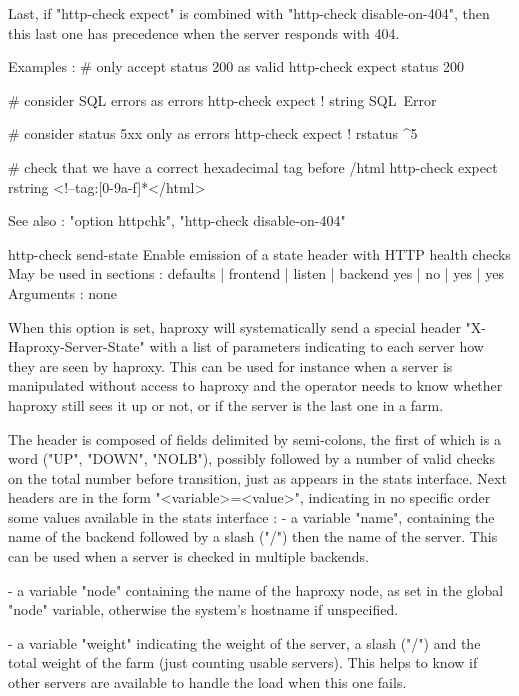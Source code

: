   Last, if "http-check expect" is combined with "http-check disable-on-404",
  then this last one has precedence when the server responds with 404.

  Examples :
         # only accept status 200 as valid
         http-check expect status 200

         # consider SQL errors as errors
         http-check expect ! string SQL\ Error

         # consider status 5xx only as errors
         http-check expect ! rstatus ^5

         # check that we have a correct hexadecimal tag before /html
         http-check expect rstring <!--tag:[0-9a-f]*</html>

  See also : "option httpchk", "http-check disable-on-404"


http-check send-state
  Enable emission of a state header with HTTP health checks
  May be used in sections :   defaults | frontend | listen | backend
                                 yes   |    no    |   yes  |   yes
  Arguments : none

  When this option is set, haproxy will systematically send a special header
  "X-Haproxy-Server-State" with a list of parameters indicating to each server
  how they are seen by haproxy. This can be used for instance when a server is
  manipulated without access to haproxy and the operator needs to know whether
  haproxy still sees it up or not, or if the server is the last one in a farm.

  The header is composed of fields delimited by semi-colons, the first of which
  is a word ("UP", "DOWN", "NOLB"), possibly followed by a number of valid
  checks on the total number before transition, just as appears in the stats
  interface. Next headers are in the form "<variable>=<value>", indicating in
  no specific order some values available in the stats interface :
    - a variable "name", containing the name of the backend followed by a slash
      ("/") then the name of the server. This can be used when a server is
      checked in multiple backends.

    - a variable "node" containing the name of the haproxy node, as set in the
      global "node" variable, otherwise the system's hostname if unspecified.

    - a variable "weight" indicating the weight of the server, a slash ("/")
      and the total weight of the farm (just counting usable servers). This
      helps to know if other servers are available to handle the load when this
      one fails.

